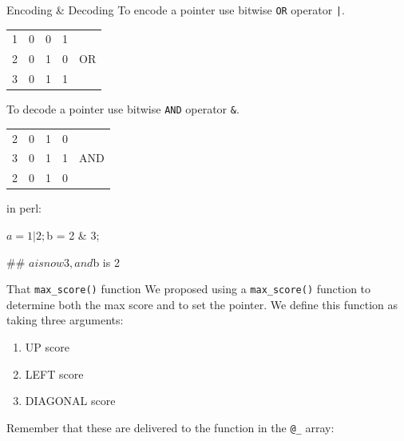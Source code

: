\documentclass[pdf]{beamer}
\begin{document}
\begin{frame}[fragile]{Encoding \& Decoding}
  To encode a pointer use bitwise \texttt{OR} operator \verb#|#.
  
  \begin{tabular}{ c|ccc|c }
    1 & 0 & 0 & 1 &\\
    2 & 0 & 1 & 0 & OR\\
    \hline
    3 & 0 & 1 & 1 &\\
  \end{tabular}
  
  \vspace{0.5cm}
  To decode a pointer use bitwise \texttt{AND} operator \verb|&|.\\
  \begin{tabular}{ c|ccc|c }
    2 & 0 & 1 & 0 &\\
    3 & 0 & 1 & 1 & AND\\
    \hline
    2 & 0 & 1 & 0 &\\
  \end{tabular}
  
  \vspace{0.5cm}
  in perl:
  \begin{perlcode}
    $a = 1 | 2;
    $b = 2 & 3;

    ## $a is now 3, and $b is 2
  \end{perlcode}
\end{frame}

\begin{frame}[fragile]{That \texttt{max\_score()} function}
  We proposed using a \texttt{max\_score()} function to determine both the max
  score and to set the pointer. We define this function as taking three
  arguments:
  \begin{enumerate}
  \item UP score
  \item LEFT score
  \item DIAGONAL score
  \end{enumerate}
  
  Remember that these are delivered to the function in the \verb|@_| array:

\end{frame}
\end{document}
